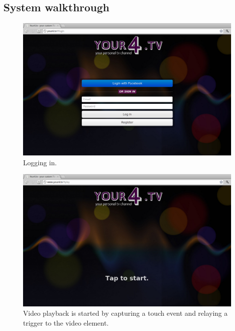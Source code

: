 \subsection{System walkthrough}
\begin{figure}[th]
	\centering
	\includegraphics[width=\textwidth,height=0.5\textheight,keepaspectratio]{images/screenshots/your4-login.png}
	\caption{Logging in.}
	\label{fig:your4-login}
\end{figure}
\begin{figure}[th]
	\centering
	\includegraphics[width=\textwidth,height=0.5\textheight,keepaspectratio]{images/screenshots/your4-tap-to-start.png}
	\caption{Video playback is started by capturing a touch event and relaying a trigger to the video element.}
	\label{fig:your4-tap-to-start}
\end{figure}

